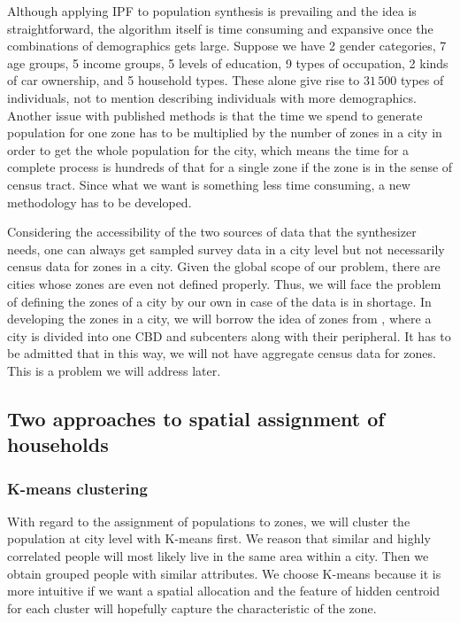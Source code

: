 \documentclass{article}
\begin{document}
Although applying IPF to population synthesis is prevailing and the idea is straightforward, the algorithm itself is time consuming and expansive once the combinations of demographics gets large.
Suppose we have 2 gender categories, 7 age groups, 5 income groups, 5 levels of education, 9 types of occupation, 2 kinds of car ownership, and 5 household types.
These alone give rise to $31\,500$ types of individuals, not to mention describing individuals with more demographics.
Another issue with published methods is that the time we spend to generate population for one zone has to be multiplied by the number of zones in a city in order to get the whole population for the city, which means the time for a complete process is hundreds of that for a single zone if the zone is in the sense of census tract.
Since what we want is something less time consuming, a new methodology has to be developed.

Considering the accessibility of the two sources of data that the synthesizer needs, one can always get sampled survey data in a city level but not necessarily census data for zones in a city.
Given the global scope of our problem, there are cities whose zones are even not defined properly.
Thus, we will face the problem of defining the zones of a city by our own in case of the data is in shortage.
In developing the zones in a city, we will borrow the idea of zones from \textcite{fielbaum2016parametric}, where a city is divided into one CBD and subcenters along with their peripheral.
It has to be admitted that in this way, we will not have aggregate census data for zones. This is a problem we will address later. 

\subsection{Two approaches to spatial assignment of households}
\subsubsection{K-means clustering}
With regard to the assignment of populations to zones, we will cluster the population at city level with K-means first.
We reason that similar and highly correlated people will most likely live in the same area within a city.
Then we obtain grouped people with similar attributes.
We choose K-means because it is more intuitive if we want a spatial allocation and the feature of hidden centroid for each cluster will hopefully capture the characteristic of the zone.
\end{document}
